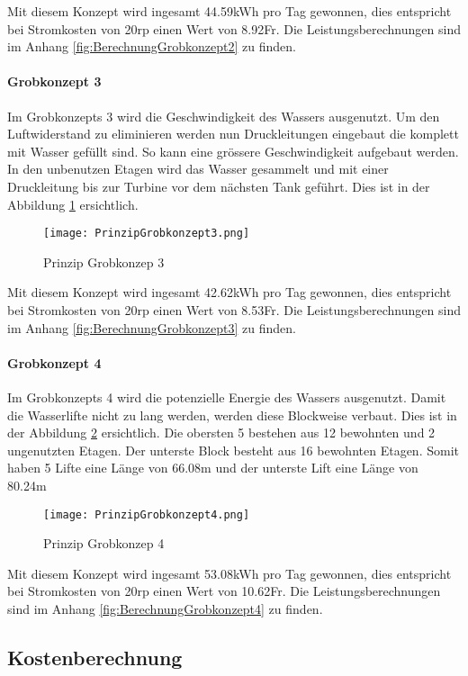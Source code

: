 Mit diesem Konzept wird ingesamt 44.59\si{kWh} pro Tag gewonnen, dies entspricht bei Stromkosten von 20\si{rp} einen Wert von 8.92\si{Fr}. Die Leistungsberechnungen sind im Anhang \ref{fig:BerechnungGrobkonzept2}  zu finden.

\newpage

\paragraph{Grobkonzept 3}

Im Grobkonzepts 3 wird die Geschwindigkeit des Wassers ausgenutzt. Um den Luftwiderstand zu eliminieren werden nun Druckleitungen eingebaut die komplett mit Wasser gefüllt sind. So kann eine grössere Geschwindigkeit aufgebaut werden. In den unbenutzen Etagen wird das Wasser gesammelt und mit einer Druckleitung bis zur Turbine vor dem nächsten Tank geführt. Dies ist in der Abbildung \ref{fig:PrinzipGrobkonzept3}  ersichtlich. 

\begin{figure} [H]
	\centering
	\texttt{[image: PrinzipGrobkonzept3.png]}
	\caption{Prinzip Grobkonzep 3}
	\label{fig:PrinzipGrobkonzept3}
\end{figure}

Mit diesem Konzept wird ingesamt 42.62\si{kWh} pro Tag gewonnen, dies entspricht bei Stromkosten von 20\si{rp} einen Wert von 8.53\si{Fr}. Die Leistungsberechnungen sind im Anhang \ref{fig:BerechnungGrobkonzept3}  zu finden.

\newpage

\paragraph{Grobkonzept 4}

Im Grobkonzepts 4 wird die potenzielle Energie des Wassers ausgenutzt. Damit die Wasserlifte nicht zu lang werden, werden diese Blockweise verbaut. Dies ist in der Abbildung \ref{fig:PrinzipGrobkonzept4}  ersichtlich. Die obersten 5 bestehen aus 12 bewohnten und 2 ungenutzten Etagen. Der unterste Block besteht aus 16 bewohnten Etagen. Somit haben 5 Lifte eine Länge von 66.08\si{m} und der unterste Lift eine Länge von 80.24\si{m}

\begin{figure} [H]
	\centering
	\texttt{[image: PrinzipGrobkonzept4.png]}
	\caption{Prinzip Grobkonzep 4}
	\label{fig:PrinzipGrobkonzept4}
\end{figure}

Mit diesem Konzept wird ingesamt 53.08\si{kWh} pro Tag gewonnen, dies entspricht bei Stromkosten von 20\si{rp} einen Wert von 10.62\si{Fr}. Die Leistungsberechnungen sind im Anhang \ref{fig:BerechnungGrobkonzept4}  zu finden.

\newpage

\subsection{Kostenberechnung} \label{subsec:kostenberechnung}